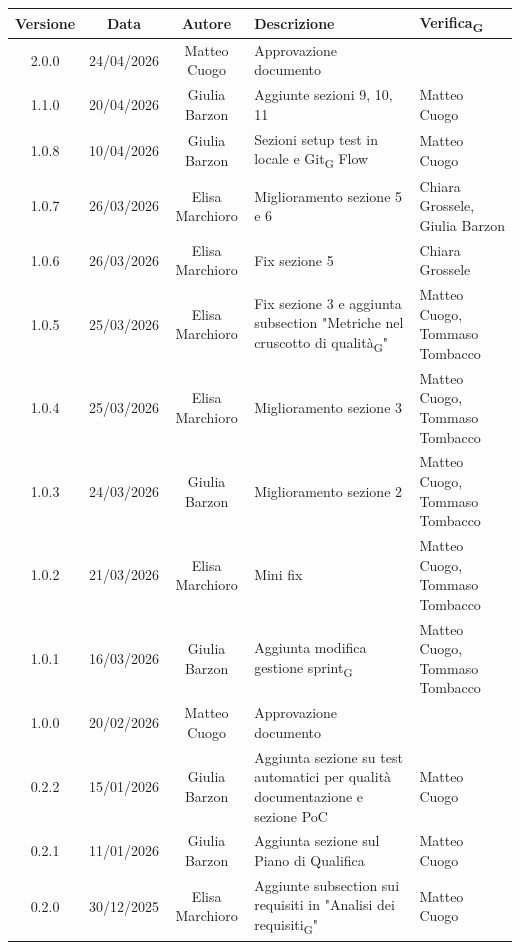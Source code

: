 \documentclass[11pt,a4paper]{article}
\newcommand{\gls}[1]{#1\textsubscript{G}}
\begin{document}
\begin{table}[H]
    \centering
    \begin{tabular}{|c|c|c|>{\raggedright\arraybackslash}p{}|p{}|}
        \hline
        \textbf{Versione} & \textbf{Data} & \textbf{Autore} & \textbf{Descrizione} & \textbf{\gls{Verifica}} \\
        \hline
        2.0.0 & 24/04/2026 & Matteo Cuogo & Approvazione documento& \\
        \hline
        1.1.0 & 20/04/2026 & Giulia Barzon & Aggiunte sezioni 9, 10, 11& Matteo Cuogo\\
        \hline
        1.0.8 & 10/04/2026 & Giulia Barzon & Sezioni setup test in locale e \gls{Git} Flow & Matteo Cuogo\\
        \hline
        1.0.7 & 26/03/2026 & Elisa Marchioro & Miglioramento sezione 5 e 6 & Chiara Grossele, Giulia Barzon\\
        \hline
        1.0.6 & 26/03/2026 & Elisa Marchioro & Fix sezione 5 & Chiara Grossele\\
        \hline
        1.0.5 & 25/03/2026 & Elisa Marchioro & Fix sezione 3 e aggiunta subsection "\gls{Metriche nel cruscotto di qualità}" & Matteo Cuogo, Tommaso Tombacco \\
        \hline
        1.0.4 & 25/03/2026 & Elisa Marchioro & Miglioramento sezione 3 & Matteo Cuogo, Tommaso Tombacco \\
        \hline
        1.0.3 & 24/03/2026 & Giulia Barzon & Miglioramento sezione 2 &  Matteo Cuogo, Tommaso Tombacco \\
        \hline
        1.0.2 & 21/03/2026 & Elisa Marchioro & Mini fix & Matteo Cuogo, Tommaso Tombacco \\
        \hline
        1.0.1 & 16/03/2026 & Giulia Barzon & Aggiunta modifica gestione \gls{sprint} & Matteo Cuogo, Tommaso Tombacco \\
        \hline
        1.0.0 & 20/02/2026 & Matteo Cuogo & Approvazione documento & \\
        \hline
        0.2.2 & 15/01/2026 & Giulia Barzon & Aggiunta sezione su test automatici per qualità documentazione e sezione PoC & Matteo Cuogo\\
        \hline
        0.2.1 & 11/01/2026 & Giulia Barzon & Aggiunta sezione sul Piano di Qualifica & Matteo Cuogo\\
        \hline
        0.2.0 & 30/12/2025 & Elisa Marchioro & Aggiunte subsection sui requisiti in "\gls{Analisi dei requisiti}" & Matteo Cuogo\\ 

\end{tabular}
\end{table}
\end{document}
